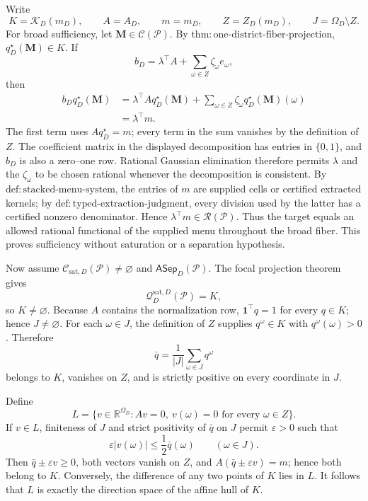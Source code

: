 Write
\[
K=\mathcal K_D(m_D),\qquad A=A_D,\qquad m=m_D,
\qquad Z=Z_D(m_D),\qquad J=\Omega_D\setminus Z.
\]
For broad sufficiency, let \(\mathbf M\in\mathcal C(\mathcal P)\).  By \(\mathrm{thm:one\text{-}district\text{-}fiber\text{-}projection}\), \(q_D^\star(\mathbf M)\in K\).  If
\[
b_D=\lambda^\top A+
\sum_{\omega\in Z}\zeta_\omega e_\omega,
\]
then
\[
\begin{aligned}
b_Dq_D^\star(\mathbf M)
&=\lambda^\top A q_D^\star(\mathbf M)
+\sum_{\omega\in Z}\zeta_\omega q_D^\star(\mathbf M)(\omega)\\
&=\lambda^\top m.
\end{aligned}
\]
The first term uses \(Aq_D^\star=m\); every term in the sum vanishes by the definition of \(Z\).  The coefficient matrix in the displayed decomposition has entries in \(\{0,1\}\), and \(b_D\) is also a zero--one row.  Rational Gaussian elimination therefore permits \(\lambda\) and the \(\zeta_\omega\) to be chosen rational whenever the decomposition is consistent.  By \(\mathrm{def:stacked\text{-}menu\text{-}system}\), the entries of \(m\) are supplied cells or certified extracted kernels; by \(\mathrm{def:typed\text{-}extraction\text{-}judgment}\), every division used by the latter has a certified nonzero denominator.  Hence \(\lambda^\top m\in\mathscr R(\mathcal P)\).  Thus the target equals an allowed rational functional of the supplied menu throughout the broad fiber.  This proves sufficiency without saturation or a separation hypothesis.

Now assume \(\mathcal C_{\mathrm{sat},D}(\mathcal P)\ne\varnothing\) and \(\mathsf{ASep}_D(\mathcal P)\).  The focal projection theorem gives
\[
\mathcal Q_D^{\mathrm{sat},D}(\mathcal P)=K,
\]
so \(K\ne\varnothing\).  Because \(A\) contains the normalization row, \(\mathbf 1^\top q=1\) for every \(q\in K\); hence \(J\ne\varnothing\).  For each \(\omega\in J\), the definition of \(Z\) supplies \(q^\omega\in K\) with \(q^\omega(\omega)>0\).  Therefore
\[
\bar q=\frac{1}{\lvert J\rvert}\sum_{\omega\in J}q^\omega
\]
belongs to \(K\), vanishes on \(Z\), and is strictly positive on every coordinate in \(J\).

Define
\[
L=\{v\in\mathbb R^{\Omega_D}:Av=0,
\ v(\omega)=0\text{ for every }\omega\in Z\}.
\]
If \(v\in L\), finiteness of \(J\) and strict positivity of \(\bar q\) on \(J\) permit \(\varepsilon>0\) such that
\[
\varepsilon\lvert v(\omega)\rvert
\leq\frac12\bar q(\omega)
\qquad(\omega\in J).
\]
Then \(\bar q\pm\varepsilon v\geq0\), both vectors vanish on \(Z\), and
\(A(\bar q\pm\varepsilon v)=m\); hence both belong to \(K\).  Conversely, the difference of any two points of \(K\) lies in \(L\).  It follows that \(L\) is exactly the direction space of the affine hull of \(K\).

